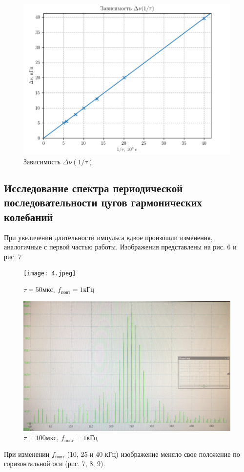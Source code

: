 \documentclass[12pt,a4paper]{article}
\begin{document}
\begin{figure}[h!]
    \centering
    \includegraphics[width=0.7\linewidth]{dv(1_t).png}
    \caption{Зависимость $\Delta \nu (1/\tau)$}
\end{figure}


\subsection{Исследование спектра периодической последовательности цугов гармонических колебаний}

    При увеличении длительности импульса вдвое произошли изменения, аналогичные с первой частью работы.
    Изображения представлены на рис. 6 и рис. 7
\begin{figure}[h!]
    \centering
    \texttt{[image: 4.jpeg]}
    \caption[]{$\tau = 50мкс,\ f_{повт} = 1кГц$}
\end{figure}
\begin{figure}[h!]
\centering
    \includegraphics[width=0.5\linewidth]{5.jpeg}
    \caption[]{$\tau = 100мкс,\ f_{повт} = 1кГц$}
\end{figure}
\newpage

    При изменении $f_{повт}$ (10, 25 и 40 кГц) изображение меняло свое положение по горизонтальной оси (рис. 7, 8, 9).
\end{document}
